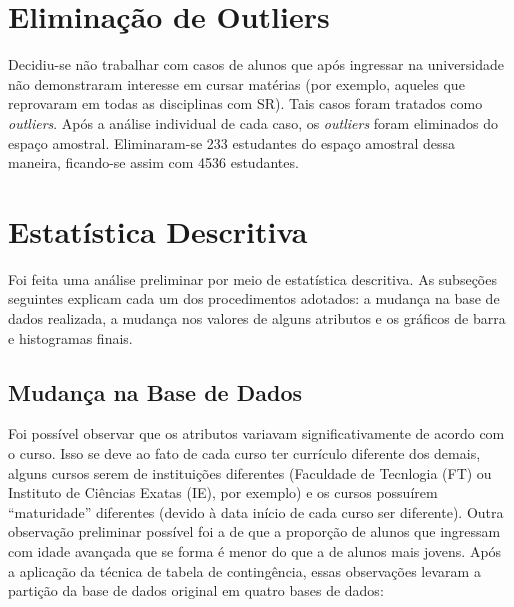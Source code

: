 \section{Eliminação de Outliers}
Decidiu-se não trabalhar com casos de alunos que após ingressar na universidade não
demonstraram interesse em cursar matérias (por exemplo, aqueles que reprovaram em
todas as disciplinas com SR). Tais casos foram tratados como \textit{outliers}.
Após a análise individual de cada caso, os \textit{outliers} foram eliminados do espaço
amostral. Eliminaram-se 233 estudantes do espaço amostral dessa maneira, ficando-se
assim com 4536 estudantes.

\section{Estatística Descritiva}
Foi feita uma análise preliminar por meio de estatística descritiva. As subseções
seguintes explicam cada um dos procedimentos adotados: a mudança na base
de dados realizada, a mudança nos valores de alguns atributos e os gráficos de barra
e histogramas finais. 

\subsection{Mudança na Base de Dados}
\par Foi possível observar que os atributos variavam significativamente de acordo com
o curso. Isso se deve ao fato de cada curso ter currículo diferente dos
demais, alguns cursos serem de instituições diferentes (Faculdade de Tecnlogia
(\acrshort{FT}) ou Instituto de Ciências Exatas (\acrshort{IE}), por exemplo) e os
cursos possuírem ``maturidade'' diferentes (devido à data início de cada curso ser
diferente). Outra observação preliminar possível foi a de que a proporção de alunos
que ingressam com idade avançada que se forma é menor do que a de alunos mais jovens.
Após a aplicação da técnica de tabela de contingência, 
essas observações levaram a partição da base de dados original em quatro bases de dados: 

